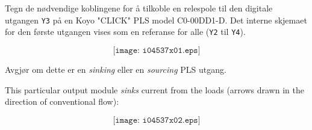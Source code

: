 

Tegn de nødvendige koblingene for å tilkoble en relespole til den digitale utgangen \texttt{Y3} på en Koyo "CLICK" PLS model C0-00DD1-D. Det interne skjemaet for den første utgangen vises som en referanse for alle (\texttt{Y2} til \texttt{Y4}). 


$$\texttt{[image: i04537x01.eps]}$$

Avgjør om dette er en \textit{sinking} eller en \textit{sourcing} PLS utgang. 







This particular output module {\it sinks} current from the loads (arrows drawn in the direction of conventional flow):

$$\texttt{[image: i04537x02.eps]}$$











